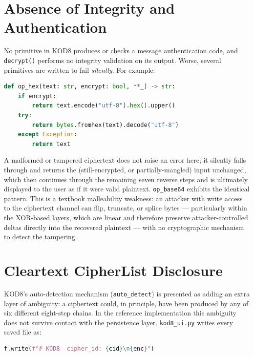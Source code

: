 \documentclass[11pt]{article}
\begin{document}
\section{Absence of Integrity and Authentication}

No primitive in KOD8 produces or checks a message authentication code,
and \texttt{decrypt()} performs no integrity validation on its output.
Worse, several primitives are written to fail \emph{silently}. For
example:

\begin{lstlisting}[language=Python]
def op_hex(text: str, encrypt: bool, **_) -> str:
    if encrypt:
        return text.encode("utf-8").hex().upper()
    try:
        return bytes.fromhex(text).decode("utf-8")
    except Exception:
        return text
\end{lstlisting}

A malformed or tampered ciphertext does not raise an error here; it
silently falls through and returns the (still-encrypted, or
partially-mangled) input unchanged, which then continues through the
remaining seven reverse steps and is ultimately displayed to the user as
if it were valid plaintext. \texttt{op\_base64} exhibits the identical
pattern. This is a textbook malleability weakness: an attacker with
write access to the ciphertext channel can flip, truncate, or splice
bytes --- particularly within the XOR-based layers, which are linear and
therefore preserve attacker-controlled deltas directly into the
recovered plaintext --- with no cryptographic mechanism to detect the
tampering.

\section{Cleartext CipherList Disclosure}
\label{sec:cid}

KOD8's auto-detection mechanism (\texttt{auto\_detect}) is presented as
adding an extra layer of ambiguity: a ciphertext could, in principle,
have been produced by any of six different eight-step chains. In the
reference implementation this ambiguity does not survive contact with
the persistence layer. \texttt{kod8\_ui.py} writes every saved file as:

\begin{lstlisting}[language=Python]
f.write(f"# KOD8  cipher_id: {cid}\n{enc}")
\end{lstlisting}
\end{document}
